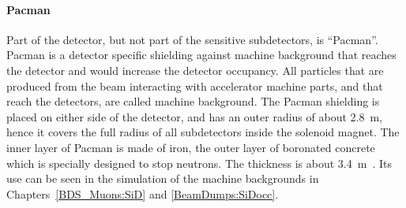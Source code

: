 \paragraph{Pacman}
Part of the detector, but not part of the sensitive subdetectors, is ``Pacman''.
Pacman is a detector specific shielding against machine background that reaches the detector and would increase the detector occupancy.
All particles that are produced from the beam interacting with accelerator machine parts, and that reach the detectors, are called machine background.
The Pacman shielding is placed on either side of the detector, and has an outer radius of about \SI{2.8}{\meter}, hence it covers the full radius of all subdetectors inside the solenoid magnet.
The inner layer of Pacman is made of iron, the outer layer of boronated concrete which is specially designed to stop neutrons.
The thickness is about \SI{3.4}{\meter}~\cite{SiD_Geo}.
Its use can be seen in the simulation of the machine backgrounds in Chapters~\ref{BDS_Muons:SiD} and \ref{BeamDumps:SiDocc}.

